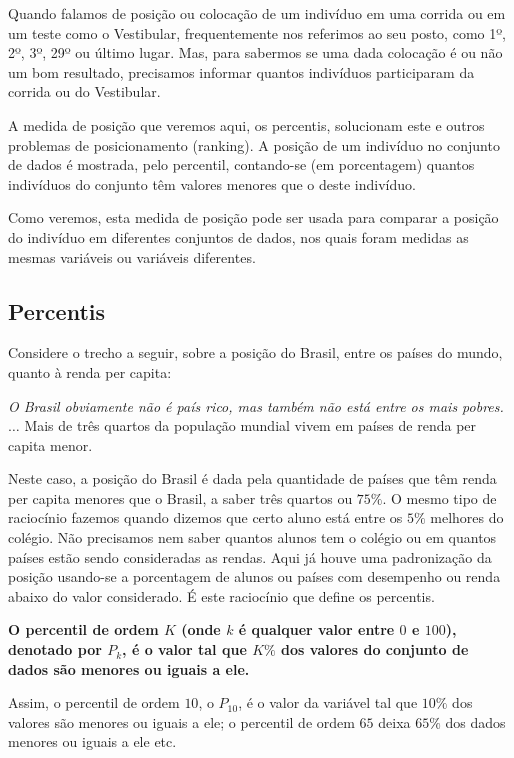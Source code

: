 \documentclass[
]{book}
\begin{document}
Quando falamos de posição ou colocação de um indivíduo em uma corrida ou em um teste como o Vestibular, frequentemente nos referimos ao seu posto, como 1º, 2º, 3º, 29º ou último lugar. Mas, para sabermos se uma dada colocação é ou não um bom resultado, precisamos informar quantos indivíduos participaram da corrida ou do Vestibular.

A medida de posição que veremos aqui, os percentis, solucionam este e outros problemas de posicionamento (ranking). A posição de um indivíduo no conjunto de dados é mostrada, pelo percentil, contando-se (em porcentagem) quantos indivíduos do conjunto têm valores menores que o deste indivíduo.

Como veremos, esta medida de posição pode ser usada para comparar a posição do indivíduo em diferentes conjuntos de dados, nos quais foram medidas as mesmas variáveis ou variáveis diferentes.

\hypertarget{percentis}{%
\subsection{Percentis}\label{percentis}}

Considere o trecho a seguir, sobre a posição do Brasil, entre os países do mundo, quanto à renda per capita:

\emph{O Brasil obviamente não é país rico, mas também não está entre os mais pobres.} \(\ldots\) Mais de três quartos da população mundial vivem em países de renda per capita menor.

Neste caso, a posição do Brasil é dada pela quantidade de países que têm renda per capita menores que o Brasil, a saber três quartos ou \(75\%\). O mesmo tipo de raciocínio fazemos quando dizemos que certo aluno está entre os \(5\%\) melhores do colégio. Não precisamos nem saber quantos alunos tem o colégio ou em quantos países estão sendo consideradas as rendas. Aqui já houve uma padronização da posição usando-se a porcentagem de alunos ou países com desempenho ou renda abaixo do valor considerado. É este raciocínio que define os percentis.

\textbf{O percentil de ordem \(K\) (onde \(k\) é qualquer valor entre \(0\) e \(100\)), denotado por \(P_k\), é o valor tal que \(K\%\) dos valores do conjunto de dados são menores ou iguais a ele.}

Assim, o percentil de ordem \(10\), o \(P_{10}\), é o valor da variável tal que \(10\%\) dos valores são menores ou iguais a ele; o percentil de ordem \(65\) deixa \(65\%\) dos dados menores ou iguais a ele etc.
\end{document}
